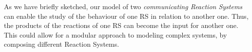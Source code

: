 As we have briefly sketched, our model of two 
 \emph{communicating Reaction Systems} can enable the study of the behaviour of one RS in relation to another one. 
Thus, the products of the reactions of one RS can become the input for another one. 
This could allow for a modular approach to modeling complex systems, by composing different Reaction Systems. 






